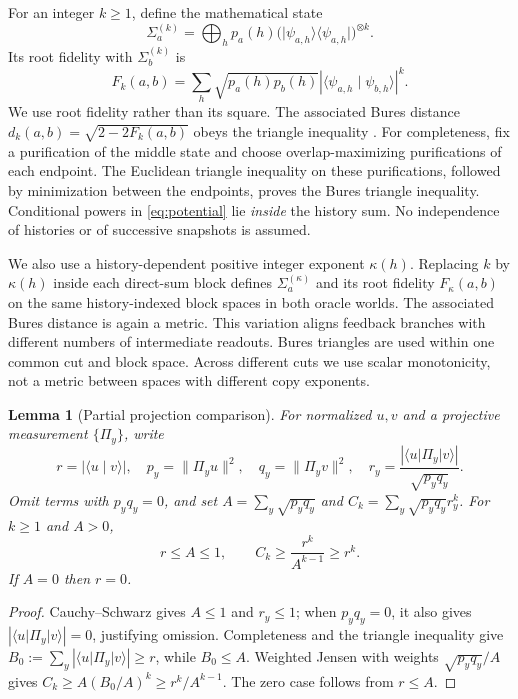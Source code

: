 \documentclass[11pt]{article}
\newtheorem{lemma}[theorem]{Lemma}
\theoremstyle{remark}
\newcommand{\ket}[1]{\lvert #1\rangle}
\newcommand{\bra}[1]{\langle #1\rvert}
\newcommand{\ip}[2]{\langle #1\mid #2\rangle}
\begin{document}
For an integer $k\ge1$, define the mathematical state
\begin{equation}
 \Sigma_a^{(k)}=\bigoplus_h p_a(h)
 \bigl(\ket{\psi_{a,h}}\bra{\psi_{a,h}}\bigr)^{\otimes k}.
\end{equation}
Its root fidelity with $\Sigma_b^{(k)}$ is
\begin{equation}\label{eq:potential}
 F_k(a,b)=\sum_h\sqrt{p_a(h)p_b(h)}
       |\ip{\psi_{a,h}}{\psi_{b,h}}|^k.
\end{equation}
We use root fidelity rather than its square. The associated Bures distance
$d_k(a,b)=\sqrt{2-2F_k(a,b)}$ obeys the triangle inequality \cite{gln}.
For completeness, fix a purification of the middle state and choose
overlap-maximizing purifications of each endpoint. The Euclidean triangle
inequality on these purifications, followed by minimization between the
endpoints, proves the Bures triangle inequality. Conditional powers in
\eqref{eq:potential} lie \emph{inside} the history sum. No independence
of histories or of successive snapshots is assumed.

We also use a history-dependent positive integer exponent $\kappa(h)$.
Replacing $k$ by $\kappa(h)$ inside each direct-sum block defines
$\Sigma_a^{(\kappa)}$ and its root fidelity $F_\kappa(a,b)$ on the same
history-indexed block spaces in both oracle worlds. The associated Bures
distance is again a metric. This variation aligns feedback branches with
different numbers of intermediate readouts. Bures triangles are used within
one common cut and block space. Across different cuts we use scalar
monotonicity, not a metric between spaces with different copy exponents.

\begin{lemma}[Partial projection comparison]\label{lem:projection}
For normalized $u,v$ and a projective measurement $\{\Pi_y\}$, write
\[
 r=|\ip u v|,\quad p_y=\|\Pi_yu\|^2,\quad q_y=\|\Pi_yv\|^2,
 \quad r_y=\frac{|\bra u\Pi_y\ket v|}{\sqrt{p_yq_y}}.
\]
Omit terms with $p_yq_y=0$, and set
$A=\sum_y\sqrt{p_yq_y}$ and
$C_k=\sum_y\sqrt{p_yq_y}r_y^k$. For $k\ge1$ and $A>0$,
\begin{equation}\label{eq:jensen}
 r\le A\le1,\qquad C_k\ge\frac{r^k}{A^{k-1}}\ge r^k.
\end{equation}
If $A=0$ then $r=0$.
\end{lemma}
\begin{proof}
Cauchy--Schwarz gives $A\le1$ and $r_y\le1$; when $p_yq_y=0$, it also gives
$|\bra u\Pi_y\ket v|=0$, justifying omission. Completeness and the triangle
inequality give
$B_0:=\sum_y|\bra u\Pi_y\ket v|\ge r$, while $B_0\le A$.
Weighted Jensen with weights $\sqrt{p_yq_y}/A$ gives
$C_k\ge A(B_0/A)^k\ge r^k/A^{k-1}$. The zero case follows from $r\le A$.
\end{proof}
\end{document}
